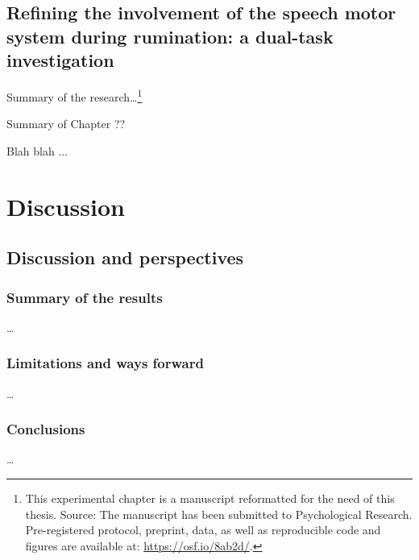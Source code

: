 \documentclass[a4paper,12pt,oneside,oldfontcommands]{memoir}
\let\rmarkdownfootnote\footnote%
\def\footnote{\protect\rmarkdownfootnote}
\newcommand\getcurrentref[1]{
 \ifnumequal{\value{#1}}{0}
  {??}
  {\the\value{#1}}
}
\begin{document}
\chapter{Refining the involvement of the speech motor system during
rumination: a dual-task
investigation}\label{refining-the-involvement-of-the-speech-motor-system-during-rumination-a-dual-task-investigation}

Summary of the research\ldots{}\footnote{This experimental chapter is a
  manuscript reformatted for the need of this thesis. Source: The
  manuscript has been submitted to Psychological Research.
  Pre-registered protocol, preprint, data, as well as reproducible code
  and figures are available at: \url{https://osf.io/8ab2d/}.}

\begin{summary}{Summary of Chapter\getcurrentref{chapter}}

Blah blah ...

\end{summary}

\part{Discussion}\label{part-discussion}

\chapter{Discussion and perspectives}\label{discussion-and-perspectives}

\section{Summary of the results}\label{summary-of-the-results}

\ldots{}

\section{Limitations and ways
forward}\label{limitations-and-ways-forward}

\ldots{}

\section{Conclusions}\label{conclusions}

\ldots{}

\noindent
\setlength{\parindent}{-0.20in} \setlength{\leftskip}{0.20in}
\setlength{\parskip}{8pt}


\end{document}

